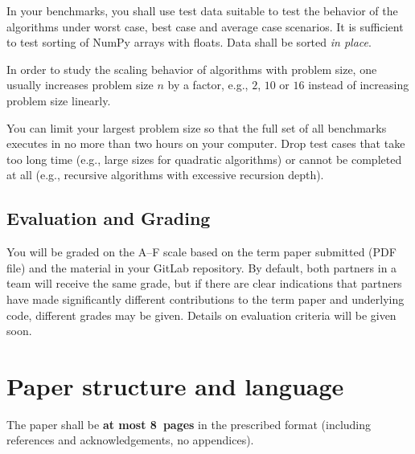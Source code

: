 \documentclass[sigconf, nonacm, natbib, screen, balance=False]{acmart}
\begin{document}
In your benchmarks, you shall use test data suitable to test the
behavior of the algorithms under worst case, best case and average
case scenarios. It is sufficient to test sorting of NumPy arrays with
floats. Data shall be sorted \emph{in place}.

In order to study the scaling behavior of algorithms with problem
size, one usually increases problem size $n$ by a factor, e.g., $2$,
$10$ or $16$ instead of increasing problem size linearly.

You can limit your largest problem size so that the full set of all
benchmarks executes in no more than two hours on your
computer. Drop test cases that take too long time (e.g., large sizes
for quadratic algorithms) or cannot be completed at all (e.g.,
recursive algorithms with excessive recursion depth).

\subsection{Evaluation and Grading}\label{sec:eval}

You will be graded on the A--F scale based on the term paper submitted
(PDF file) and the material in your GitLab repository. By default,
both partners in a team will receive the same grade, but if there are
clear indications that partners have made significantly different
contributions to the term paper and underlying code, different grades
may be given. Details on evaluation criteria will be given soon. 


\section{Paper structure and language}\label{sec:structure}

The paper shall be \textbf{at most 8~pages} in the prescribed format
(including references and acknowledgements, no appendices). 
\end{document}
